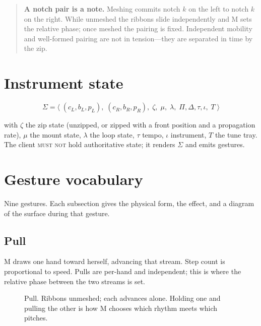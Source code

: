 \documentclass[11pt,a4paper]{article}
\newcommand{\MUSTNOT}{\textsc{must not}}
\theoremstyle{definition}
\theoremstyle{plain}
\theoremstyle{remark}
\newcommand{\spools}{%
  \fill[ribL,opacity=.45,rounded corners=2pt] (1.55,5.40) rectangle (2.45,5.95);
  \fill[ribR,opacity=.45,rounded corners=2pt] (5.55,5.40) rectangle (6.45,5.95);
  \node[font=\scriptsize] at (2,6.22) {left spool};
  \node[font=\scriptsize] at (6,6.22) {right spool};
}
\newcommand{\musician}{%
  \draw[gray] (4,-0.10) circle (0.23);
  \node[font=\scriptsize] at (4,-0.10) {M};
}
\newcommand{\axes}{%
  \draw[->,gray,thin] (0.85,4.30) -- (1.45,4.30) node[right,font=\scriptsize]{$x$};
  \draw[->,gray,thin] (0.85,4.30) -- (0.85,4.90) node[above,font=\scriptsize]{$z$};
}
\newcommand{\ribbonsopen}{%
  \draw[ribL,opacity=.45,line width=16pt,line join=round]
    (2,5.40) -- (2,4.60) -- (3.10,4.00) -- (3.10,0.70);
  \draw[ribR,opacity=.45,line width=16pt,line join=round]
    (6,5.40) -- (6,4.60) -- (4.90,4.00) -- (4.90,0.70);
}
\newcommand{\handat}[2]{\filldraw[fill=white,draw=gray!80,thin] (#1,#2) circle (0.17);}
\newcommand{\handsdefault}{\handat{3.10}{0.55}\handat{4.90}{0.55}}
\begin{document}
\begin{quote}
\textbf{A notch pair is a note.} Meshing commits notch $k$ on the left to notch $k$ on the right.
While unmeshed the ribbons slide independently and M sets the relative phase; once meshed the
pairing is fixed. Independent mobility and well-formed pairing are not in tension---they are
separated in time by the zip.
\end{quote}

\section{Instrument state}

\[
\Sigma = \big\langle\;
(c_L,b_L,p_L),\; (c_R,b_R,p_R),\;
\zeta,\; \mu,\; \lambda,\;
\Pi,\Delta,\tau,\iota,\; T
\;\big\rangle
\]

with $\zeta$ the zip state (unzipped, or zipped with a front position and a propagation rate),
$\mu$ the mount state, $\lambda$ the loop state, $\tau$ tempo, $\iota$ instrument, $T$ the tune
tray. The client \MUSTNOT{} hold authoritative state; it renders $\Sigma$ and emits gestures.

\section{Gesture vocabulary}
\label{sec:gestures}

Nine gestures. Each subsection gives the physical form, the effect, and a diagram of the surface
during that gesture.

\subsection{Pull}

M draws one hand toward herself, advancing that stream. Step count is proportional to speed. Pulls
are per-hand and independent; this is where the relative phase between the two streams is set.

\begin{figure}[H]\centering
{}
\caption{Pull. Ribbons unmeshed; each advances alone. Holding one and pulling the other is how M
chooses which rhythm meets which pitches.}
\end{figure}
\end{document}
